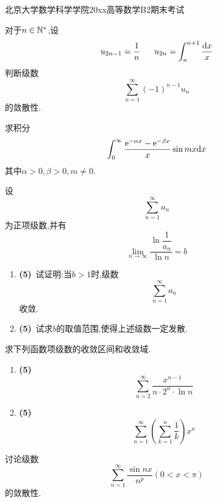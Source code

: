 \documentclass{ctexart}
\begin{document}
\pagestyle{empty}
\begin{center}\Large
    北京大学数学科学学院20xx高等数学B2期末考试
\end{center}
\begin{problem}[1.(10\songti{分})]
    对于$n\in\mathbb{N}^*$,设
    \[u_{2n-1}=\dfrac1n\ \ \ \ \ u_{2n}=\int_n^{n+1}\dfrac{\di x}{x}\]
    判断级数
    \[\sum_{n=1}^{\infty}(-1)^{n-1}u_n\]
    的敛散性.

\end{problem}

\begin{problem}[2.(10\songti{分})]
    求积分
    \[\int_0^{\infty}\dfrac{\mathrm{e}^{-\alpha x}-\mathrm{e}^{-\beta x}}{x}\sin mx\mathrm{d} x\]
    其中$\alpha>0,\beta>0,m\neq0$.

\end{problem}

\begin{problem}[3.(10\songti{分})]
    设
    \[\sum_{n=1}^{\infty}a_n\]
    为正项级数,并有
    \[\lim_{n\to\infty}\dfrac{\ln\dfrac{1}{a_n}}{\ln n}=b\]
    \begin{enumerate}[label=\tbf{(\arabic*)},topsep=0pt,parsep=0pt,itemsep=0pt,partopsep=0pt]
        \item \textbf{(5)}\ 试证明:当$b>1$时,级数
            \[\sum_{n=1}^{\infty}a_n\]
            收敛.
        \item \textbf{(5)}\ 试求$b$的取值范围,使得上述级数一定发散.
    \end{enumerate}
\end{problem}

\begin{problem}[4.(10\songti{分})]
    求下列函数项级数的收敛区间和收敛域.
    \begin{enumerate}[label=\tbf{(\arabic*)},topsep=0pt,parsep=0pt,itemsep=0pt,partopsep=0pt]
        \item \textbf{(5)}\ 
            \[\sum_{n=2}^{\infty}\dfrac{x^{n-1}}{n\cdot2^n\cdot\ln n}\]
        \item \textbf{(5\songti{分})}\ 
            \[\sum_{n=1}^{\infty}\left(\sum_{k=1}^{n}\dfrac{1}{k}\right)x^n\]

    \end{enumerate}
        
\end{problem}

\begin{problem}[5.(10\songti{分})]
    讨论级数
    \[\sum_{n=1}^{\infty}\dfrac{\sin nx}{n^p}(0<x<\pi)\]
    的敛散性.
\end{problem}
\end{document}
